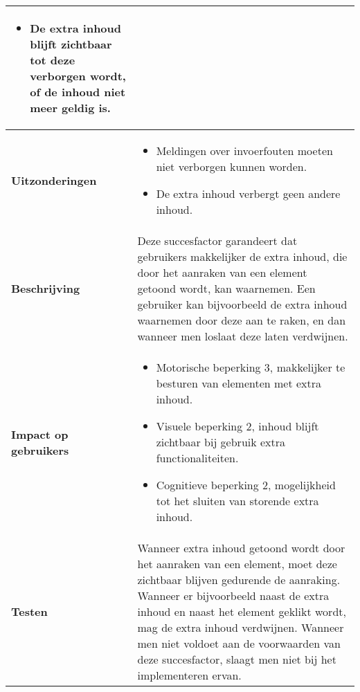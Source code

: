 \begin{table}[H]
\begin{tabular}{|l|p{12cm}|}
\begin{itemize}
            \item De extra inhoud blijft zichtbaar tot deze verborgen wordt, of de inhoud niet meer geldig is.
        \end{itemize}                                                                                                                                                                                  \\ 
        \hline
        \textbf{Uitzonderingen}     & 
        \begin{itemize}
            \item Meldingen over invoerfouten moeten niet verborgen kunnen worden.
            \item De extra inhoud verbergt geen andere inhoud.
        \end{itemize}                                                                                                                                                                                                   \\ 
        \hline
        \textbf{Beschrijving}                 & Deze succesfactor garandeert dat gebruikers makkelijker de extra inhoud, die door het aanraken van een element getoond wordt, kan waarnemen.  Een gebruiker kan bijvoorbeeld de extra inhoud waarnemen door deze aan te raken, en dan wanneer men loslaat deze laten verdwijnen.\\ 
        \hline
        \textbf{Impact op gebruikers}         &  
        \begin{itemize}
            \item Motorische beperking 3, makkelijker te besturen van elementen met extra inhoud.
            \item Visuele beperking 2, inhoud blijft zichtbaar bij gebruik extra functionaliteiten.
            \item Cognitieve beperking 2, mogelijkheid tot het sluiten van storende extra inhoud.
        \end{itemize}                                                                                                                                                                                                                                                                                                                                                                                                                    \\ 
        \hline
        \textbf{Testen}                       & Wanneer extra inhoud getoond wordt door het aanraken van een element, moet deze zichtbaar blijven gedurende de aanraking. Wanneer er bijvoorbeeld naast de extra inhoud en naast het element geklikt wordt, mag de extra inhoud verdwijnen.  Wanneer men niet voldoet aan de voorwaarden van deze succesfactor, slaagt men niet bij het implementeren ervan.                                                                                                                                                                            \\
        \hline
    \end{tabular}
    

\end{table}
